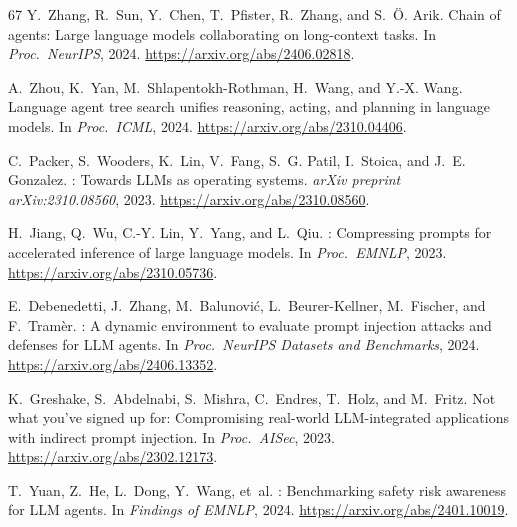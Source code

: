 \documentclass[11pt,a4paper]{article}
\begin{document}
\begin{thebibliography}{67}
Y.~Zhang, R.~Sun, Y.~Chen, T.~Pfister, R.~Zhang, and S.~{\"O}. Arik.
\newblock Chain of agents: Large language models collaborating on long-context tasks.
\newblock In \emph{Proc.\ NeurIPS}, 2024.
\newblock \url{https://arxiv.org/abs/2406.02818}.

A.~Zhou, K.~Yan, M.~Shlapentokh-Rothman, H.~Wang, and Y.-X. Wang.
\newblock Language agent tree search unifies reasoning, acting, and planning in language models.
\newblock In \emph{Proc.\ ICML}, 2024.
\newblock \url{https://arxiv.org/abs/2310.04406}.


C.~Packer, S.~Wooders, K.~Lin, V.~Fang, S.~G. Patil, I.~Stoica, and J.~E. Gonzalez.
: Towards {LLM}s as operating systems.
\newblock \emph{arXiv preprint arXiv:2310.08560}, 2023.
\newblock \url{https://arxiv.org/abs/2310.08560}.

H.~Jiang, Q.~Wu, C.-Y. Lin, Y.~Yang, and L.~Qiu.
: Compressing prompts for accelerated inference of large language models.
\newblock In \emph{Proc.\ EMNLP}, 2023.
\newblock \url{https://arxiv.org/abs/2310.05736}.


E.~Debenedetti, J.~Zhang, M.~Balunovi{\'c}, L.~Beurer-Kellner, M.~Fischer, and F.~Tram{\`e}r.
: A dynamic environment to evaluate prompt injection attacks and defenses for {LLM} agents.
\newblock In \emph{Proc.\ NeurIPS Datasets and Benchmarks}, 2024.
\newblock \url{https://arxiv.org/abs/2406.13352}.

K.~Greshake, S.~Abdelnabi, S.~Mishra, C.~Endres, T.~Holz, and M.~Fritz.
\newblock Not what you've signed up for: Compromising real-world {LLM}-integrated applications with indirect prompt injection.
\newblock In \emph{Proc.\ AISec}, 2023.
\newblock \url{https://arxiv.org/abs/2302.12173}.

T.~Yuan, Z.~He, L.~Dong, Y.~Wang, et~al.
: Benchmarking safety risk awareness for {LLM} agents.
\newblock In \emph{Findings of EMNLP}, 2024.
\newblock \url{https://arxiv.org/abs/2401.10019}.


\end{thebibliography}
\end{document}
